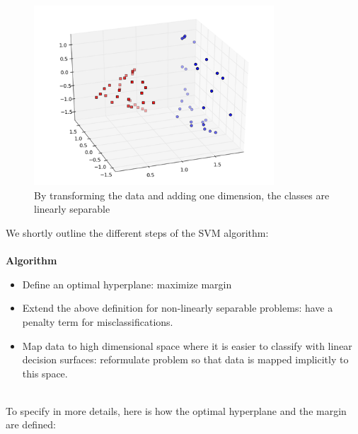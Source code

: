 \
\begin{figure}[H]
    \centering
    \includegraphics[width=0.8\textwidth]{fig/svm-lin.png}
    \caption[Short caption]{By transforming the data and adding one dimension, the classes are linearly separable}
    \label{fig:svm-lin}
\end{figure}

We shortly outline the different steps of the SVM algorithm:
\\
\\
\textbf{Algorithm}
\begin{itemize}
  \item Define an optimal hyperplane: maximize margin
  \item Extend the above definition for non-linearly separable problems: have a penalty term for misclassifications.
  \item Map data to high dimensional space where it is easier to classify with linear decision surfaces: reformulate problem so that data is mapped implicitly to this space.
\end{itemize} 
\\
To specify in more details, here is how the optimal hyperplane and the margin are defined:

